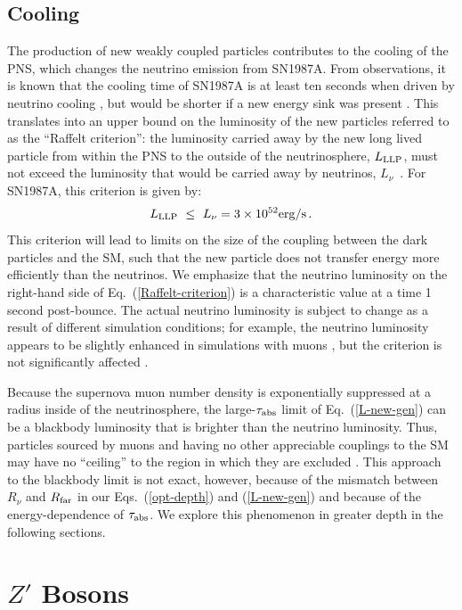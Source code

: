 \documentclass[11pt]{article}
\newcommand{\Eq}[1]{Eq.~(\ref{#1})} \newcommand{\Eqs}[2]{Eqs.~(\ref{#1}) and (\ref{#2})} \newcommand{\Eqm}[2]{Eqs.~(\ref{#1}) through (\ref{#2})}
\begin{document}
\subsection{Cooling}
The production of new weakly coupled particles contributes to the cooling of the PNS, which changes the neutrino emission from SN1987A.
From observations, it is known that the cooling time of SN1987A is at least ten seconds when driven by neutrino cooling \cite{Burrows:1986me,Burrows:1987zz}, but would be shorter if a new energy sink was present \cite{Burrows:1990pk}. This translates into an upper bound on the luminosity of the new particles referred to as the ``Raffelt criterion'': the luminosity carried away by the new long lived particle from within the PNS to the outside of the neutrinosphere, $L_{\rm LLP}$, must not exceed the luminosity that would be carried away by neutrinos, $L_\nu$~\cite{Raffelt:1996wa}. For SN1987A, this criterion is given by:
\begin{eqnarray} \label{Raffelt-criterion}
 L_{\rm LLP} \,\, \leq \,\, L_\nu = 3\times 10^{52} {\rm erg/s}\,.
\end{eqnarray}
This criterion will lead to limits on the size of the coupling between the dark particles and the SM, such that the new particle does not transfer energy more efficiently than the neutrinos. We emphasize that the neutrino luminosity on the right-hand side of \Eq{Raffelt-criterion} is a characteristic value at a time 1 second post-bounce. The actual neutrino luminosity is subject to change as a result of different simulation conditions; for example, the neutrino luminosity appears to be slightly enhanced in simulations with muons \cite{Bollig:2017lki}, but the criterion is not significantly affected \cite{Bollig:2020xdr}.

Because the supernova muon number density is exponentially suppressed at a radius inside of the neutrinosphere, the large-$\tau_{\rm abs}$ limit of \Eq{L-new-gen} can be a blackbody luminosity that is brighter than the neutrino luminosity. Thus, particles sourced by muons and having no other appreciable couplings to the SM may have no ``ceiling'' to the region in which they are excluded \cite{Bollig:2020xdr}. This approach to the blackbody limit is not exact, however, because of the mismatch between $R_\nu$ and $R_{\rm far}$ in our \Eqs{opt-depth}{L-new-gen} and because of the energy-dependence of $\tau_{\rm abs}$. We explore this phenomenon in greater depth in the following sections.



\section{$Z'$ Bosons}
\label{sec:zp}
\end{document}

